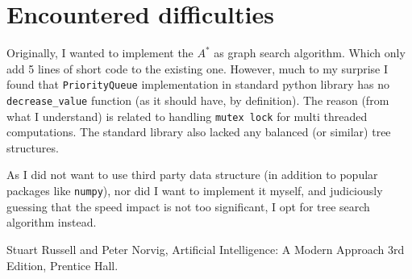 \documentclass[11pt]{article}
\begin{document}
	\section{Encountered difficulties} \label{sec:EncounteredDifficulties}
		Originally, I wanted to implement the $A^*$ as graph search algorithm. Which only add 5 lines of short code to the existing one. However, much to my surprise I found that \texttt{PriorityQueue} implementation in standard python library has no \texttt{decrease\_value} function (as it should have, by definition). The reason (from what I understand) is related to handling \texttt{mutex lock} for multi threaded computations. The standard library also lacked any balanced (or similar) tree structures.
		
		As I did not want to use third party data structure (in addition to popular packages like \texttt{numpy}), nor did I want to implement it myself, and judiciously guessing that the speed impact is not too significant, I opt for tree search algorithm instead.
		
	\begin{thebibliography}{9}
		\hypersetup{
			urlcolor= black
		}
			Stuart Russell and Peter Norvig, Artificial Intelligence: A Modern Approach $3$rd Edition, Prentice Hall.
	\end{thebibliography}
\end{document}
